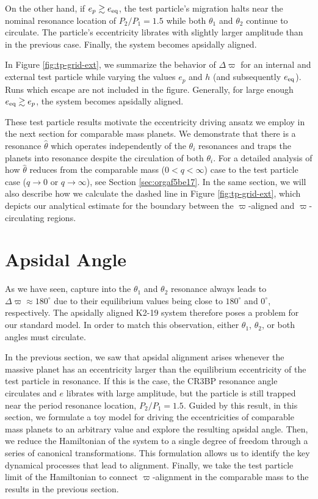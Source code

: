 \documentclass[usenatbib,onecolumn]{mnras}
\begin{document}
On the other hand, if \(e_p \gtrsim e_{\rm eq}\), the test particle's
migration halts near the nominal resonance location of \(P_2/P_1=1.5\)
while both \(\theta_1\) and \(\theta_2\) continue to circulate. The particle's
eccentricity librates with slightly larger amplitude than
in the previous case. Finally, the system becomes apsidally aligned.

In Figure \ref{fig:tp-grid-ext}, we summarize the behavior of
\(\Delta\varpi\) for an internal and external test particle while
varying the values \(e_p\) and \(h\) (and subsequently \(e_{\rm eq}\)). Runs
which escape are not included in the figure. Generally, for large
enough \(e_{\rm eq}\gtrsim e_p\), the system becomes apsidally
aligned.

These test particle results motivate the eccentricity driving ansatz
we employ in the next section for comparable mass planets. We
demonstrate that there is a resonance \(\hat\theta\) which operates
independently of the \(\theta_i\) resonances and traps the planets into
resonance despite the circulation of both \(\theta_i\). For a detailed
analysis of how \(\hat\theta\) reduces from the comparable mass
(\(0<q<\infty\)) case to the test particle case (\(q\to0\) or
\(q\to\infty\)), see Section \ref{sec:orgaf5be17}. In the same section,
we will also describe how we calculate the dashed line in Figure
\ref{fig:tp-grid-ext}, which depicts our analytical estimate for the
boundary between the $\varpi$-aligned and $\varpi$-circulating
regions.

\section{Apsidal Angle}
\label{sec:orgc8a3488}
As we have seen, capture into the \(\theta_1\) and \(\theta_2\) resonance
always leads to \(\Delta\varpi\approx 180^\circ\) due to their
equilibrium values being close to \(180^\circ\) and \(0^\circ\),
respectively.  The apsidally aligned K2-19 system therefore poses a
problem for our standard model.  In order to match this observation,
either \(\theta_1\), \(\theta_2\), or both angles must circulate.

In the previous section, we saw that apsidal alignment arises whenever
the massive planet has an eccentricity larger than the equilibrium
eccentricity of the test particle in resonance. If this is the case,
the CR3BP resonance angle circulates and \(e\) librates with large
amplitude, but the particle is still trapped near the period resonance
location, \(P_2/P_1=1.5\).  Guided by this result, in this section, we
formulate a toy model for driving the eccentricities of comparable
mass planets to an arbitrary value and explore the resulting apsidal
angle. Then, we reduce the Hamiltonian of the system to a single
degree of freedom through a series of canonical transformations.  This
formulation allows us to identify the key dynamical processes that
lead to alignment. Finally, we take the test particle limit of the
Hamiltonian to connect $\varpi$-alignment in the comparable
mass to the results in the previous section.
\end{document}
